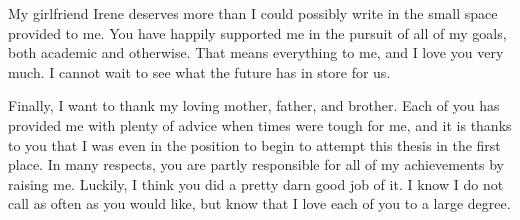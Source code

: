 \documentclass{ucbthesis}
\begin{document}
\begin{frontmatter}
\begin{acknowledgements}
My girlfriend Irene deserves more than I could possibly write in the small space provided to me. 
You have happily supported me in the pursuit of all of my goals, both academic and otherwise. 
That means everything to me, and I love you very much. I cannot wait to see what the future has in store for us. 

Finally, I want to thank my loving mother, father, and brother. 
Each of you has provided me with plenty of advice when times were tough for me, and it is thanks to you that I was even in the position to begin to attempt this thesis in the first place.
In many respects, you are partly responsible for all of my achievements by raising me. 
Luckily, I think you did a pretty darn good job of it. 
I know I do not call as often as you would like, but know that I love each of you to a large degree. 
\end{acknowledgements}

\end{frontmatter}

\pagestyle{headings}










\printbibliography
\end{document}
